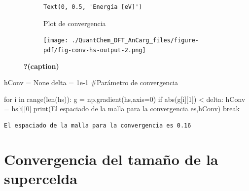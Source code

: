 \documentclass[
  letterpaper,
  DIV=11,
  numbers=noendperiod]{scrreprt}
\newenvironment{Shaded}{\begin{snugshade}}{\end{snugshade}}
\newcommand{\BuiltInTok}[1]{\textcolor[rgb]{0.00,0.23,0.31}{#1}}
\newcommand{\CommentTok}[1]{\textcolor[rgb]{0.37,0.37,0.37}{#1}}
\newcommand{\ControlFlowTok}[1]{\textcolor[rgb]{0.00,0.23,0.31}{#1}}
\newcommand{\DecValTok}[1]{\textcolor[rgb]{0.68,0.00,0.00}{#1}}
\newcommand{\FloatTok}[1]{\textcolor[rgb]{0.68,0.00,0.00}{#1}}
\newcommand{\KeywordTok}[1]{\textcolor[rgb]{0.00,0.23,0.31}{#1}}
\newcommand{\NormalTok}[1]{\textcolor[rgb]{0.00,0.23,0.31}{#1}}
\newcommand{\OperatorTok}[1]{\textcolor[rgb]{0.37,0.37,0.37}{#1}}
\newcommand{\StringTok}[1]{\textcolor[rgb]{0.13,0.47,0.30}{#1}}
\newcommand{\VariableTok}[1]{\textcolor[rgb]{0.07,0.07,0.07}{#1}}
\begin{document}
\begin{figure}
{\begin{figure}
{\centering 

\begin{verbatim}
Text(0, 0.5, 'Energía [eV]')
\end{verbatim}

}

\caption{Plot de convergencia}

\end{figure}

\begin{figure}[H]

{\centering \texttt{[image: ./QuantChem\_DFT\_AnCarg\_files/figure-pdf/fig-conv-hs-output-2.png]}

}

\end{figure}

}

\caption{\label{fig-conv-hs}\textbf{?(caption)}}

\end{figure}

\begin{Shaded}
\begin{Highlighting}[]
\NormalTok{hConv }\OperatorTok{=} \VariableTok{None}
\NormalTok{delta }\OperatorTok{=} \FloatTok{1e{-}1} \CommentTok{\#Parámetro de convergencia}

\ControlFlowTok{for}\NormalTok{ i }\KeywordTok{in} \BuiltInTok{range}\NormalTok{(}\BuiltInTok{len}\NormalTok{(hs)):}
\NormalTok{  g }\OperatorTok{=}\NormalTok{ np.gradient(hs,axis}\OperatorTok{=}\DecValTok{0}\NormalTok{)}
  \ControlFlowTok{if} \BuiltInTok{abs}\NormalTok{(g[i][}\DecValTok{1}\NormalTok{]) }\OperatorTok{\textless{}}\NormalTok{ delta:}
\NormalTok{    hConv }\OperatorTok{=}\NormalTok{ hs[i][}\DecValTok{0}\NormalTok{]}
    \BuiltInTok{print}\NormalTok{(}\StringTok{\textquotesingle{}El espaciado de la malla para la convergencia es\textquotesingle{}}\NormalTok{,hConv)}
    \ControlFlowTok{break}
\end{Highlighting}
\end{Shaded}

\begin{verbatim}
El espaciado de la malla para la convergencia es 0.16
\end{verbatim}

\hypertarget{convergencia-del-tamauxf1o-de-la-supercelda}{%
\section{Convergencia del tamaño de la
supercelda}\label{convergencia-del-tamauxf1o-de-la-supercelda}}
\end{document}
